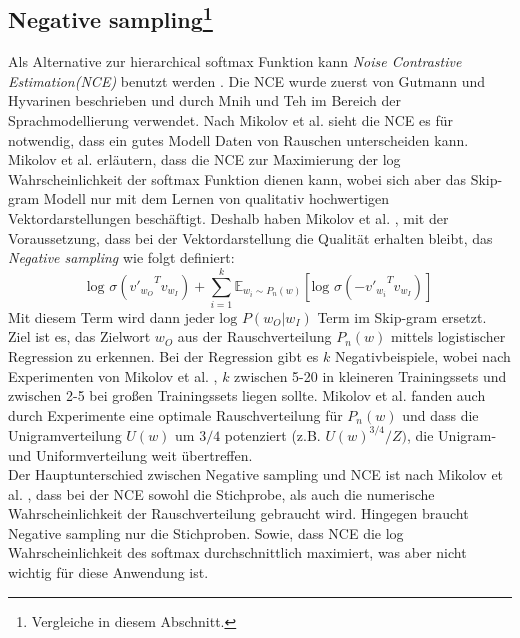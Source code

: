 \documentclass[12pt,a4paper]{report}
\begin{document}
\subsection*{Negative sampling\footnote{Vergleiche \cite{DBLP:journals/corr/MikolovSCCD13} in diesem Abschnitt.}}
Als Alternative zur hierarchical softmax Funktion kann \textit{Noise Contrastive Estimation(NCE)} benutzt werden \cite{DBLP:journals/corr/MikolovSCCD13}. Die NCE wurde zuerst von Gutmann und Hyvarinen \cite{gutmann2012noise} beschrieben und durch Mnih und Teh \cite{mnih2012fast} im Bereich der Sprachmodellierung verwendet. Nach Mikolov et al. \cite{DBLP:journals/corr/MikolovSCCD13} sieht die NCE es für notwendig, dass ein gutes Modell Daten von Rauschen unterscheiden kann. Mikolov et al. \cite{DBLP:journals/corr/MikolovSCCD13} erläutern, dass die NCE zur Maximierung der log Wahrscheinlichkeit der softmax Funktion dienen kann, wobei sich aber das Skip-gram Modell nur mit dem Lernen von qualitativ hochwertigen Vektordarstellungen beschäftigt. Deshalb haben Mikolov et al. \cite{DBLP:journals/corr/MikolovSCCD13}, mit der Voraussetzung, dass bei der Vektordarstellung die Qualität erhalten bleibt, das \textit{Negative sampling} wie folgt definiert:\\
\begin{equation}
\textrm{log }   \sigma({v'_{w_O}}^Tv_{w_I}) + \sum_{i=1}^k \mathbb{E}_{{w_i}\sim P_n(w)}\left[\textrm{log }\sigma({-v'_{w_i}}^Tv_{w_I})\right]
\end{equation}
Mit diesem Term wird dann jeder $\textrm{log }P(w_O|w_I)$ Term im Skip-gram ersetzt. Ziel ist es, das Zielwort $w_O$ aus der Rauschverteilung $P_n(w)$ mittels logistischer Regression zu erkennen\citep{DBLP:journals/corr/MikolovSCCD13}. Bei der Regression gibt es $k$ Negativbeispiele, wobei nach Experimenten von Mikolov et al. \citep{DBLP:journals/corr/MikolovSCCD13}, $k$ zwischen 5-20 in kleineren Trainingssets und zwischen 2-5 bei großen Trainingssets liegen sollte. Mikolov et al. \citep{DBLP:journals/corr/MikolovSCCD13} fanden auch durch Experimente eine optimale Rauschverteilung für $P_n(w)$ und dass die Unigramverteilung $U(w)$ um $3/4$ potenziert (z.B. ${U(w)}^{3/4} / Z)$, die Unigram- und Uniformverteilung weit übertreffen.\\
Der Hauptunterschied zwischen Negative sampling und NCE ist nach Mikolov et al. \citep{DBLP:journals/corr/MikolovSCCD13}, dass bei der NCE sowohl die Stichprobe, als auch die numerische Wahrscheinlichkeit der Rauschverteilung gebraucht wird. Hingegen braucht Negative sampling nur die Stichproben. Sowie, dass NCE die log Wahrscheinlichkeit des softmax durchschnittlich maximiert, was aber nicht wichtig für diese Anwendung ist\citep{DBLP:journals/corr/MikolovSCCD13}.\\
\end{document}
